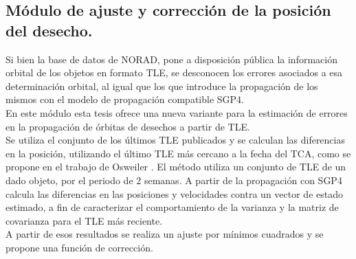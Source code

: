 

\subsection*{M\'odulo de ajuste y correcci\'on de la posici\'on del desecho.}
Si bien la base de datos de NORAD, pone a disposici\'on p\'ublica la informaci\'on orbital de los objetos en formato TLE, se desconocen los errores asociados a esa determinaci\'on orbital, al igual que los que introduce la propagaci\'on de los mismos con el modelo de propagaci\'on compatible SGP4.\\
En este m\'odulo esta tesis ofrece una nueva variante para la estimaci\'on de errores en la propagaci\'on de \'orbitas de desechos a partir de TLE.\\
Se utiliza el conjunto de los \'ultimos TLE publicados y se calculan las diferencias en la posici\'on, utilizando el \'ultimo TLE m\'as cercano a la fecha del TCA, como se propone en el trabajo de Osweiler \cite{osweiler}. El m\'etodo utiliza un conjunto de TLE de un dado objeto, por el periodo de 2 semanas. A partir de la propagaci\'on con SGP4 calcula las diferencias en las posiciones y velocidades contra un vector de estado estimado, a fin de caracterizar el comportamiento de la varianza y la matriz de covarianza para el TLE m\'as reciente.\\
A partir de esos resultados se realiza un ajuste por m\'inimos cuadrados y se propone una funci\'on de corrección.\\


